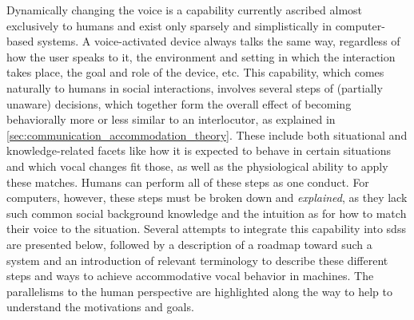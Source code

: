 Dynamically changing the voice is a capability currently ascribed almost exclusively to humans and exist only sparsely and simplistically in computer-based systems.
A voice-activated device always talks the same way, regardless of how the user speaks to it, the environment and setting in which the interaction takes place, the goal and role of the device, etc.
This capability, which comes naturally to humans in social interactions, involves several steps of (partially unaware) decisions, which together form the overall effect of becoming behaviorally more or less similar to an interlocutor, as explained in \cref{sec:communication_accommodation_theory}.
These include both situational and knowledge-related facets like how it is expected to behave in certain situations and which vocal changes fit those, as well as the physiological ability to apply these matches.
Humans can perform all of these steps as one conduct.
For computers, however, these steps must be broken down and \emph{explained}, as they lack such common social background knowledge and the intuition as for how to match their voice to the situation.
Several attempts to integrate this capability into \acp{sds} are presented below, followed by a description of a roadmap toward such a system and an introduction of relevant terminology to describe these different steps and ways to achieve accommodative vocal behavior in machines.
The parallelisms to the human perspective are highlighted along the way to help to understand the motivations and goals.

